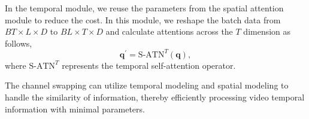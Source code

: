 

In the temporal module, we reuse the parameters from the spatial attention module to reduce the cost.
In this module, we reshape the batch data from $BT \times L \times D$ to $BL \times T \times D$ and calculate attentions across the $T$ dimension as follows, 
\begin{equation}
\label{eq5}
    {\mathbf{q}}^\prime = \text{S-ATN}^T(\mathbf{q}),
\end{equation}
where $\text{S-ATN}^T$ represents the temporal self-attention operator.

The channel swapping can utilize temporal modeling and spatial modeling to handle the similarity of information, thereby efficiently processing video temporal information with minimal parameters.

